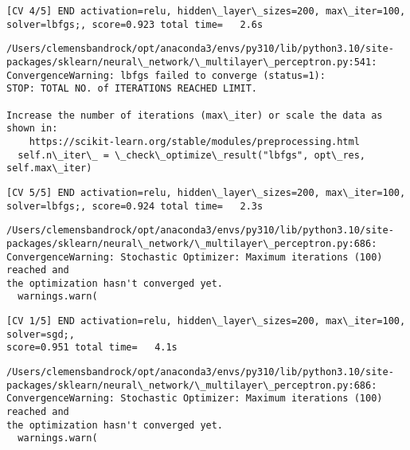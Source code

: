 \documentclass[11pt]{article}
\begin{document}
    \begin{Verbatim}[commandchars=\\\{\}]
[CV 4/5] END activation=relu, hidden\_layer\_sizes=200, max\_iter=100,
solver=lbfgs;, score=0.923 total time=   2.6s
    \end{Verbatim}

    \begin{Verbatim}[commandchars=\\\{\}]
/Users/clemensbandrock/opt/anaconda3/envs/py310/lib/python3.10/site-
packages/sklearn/neural\_network/\_multilayer\_perceptron.py:541:
ConvergenceWarning: lbfgs failed to converge (status=1):
STOP: TOTAL NO. of ITERATIONS REACHED LIMIT.

Increase the number of iterations (max\_iter) or scale the data as shown in:
    https://scikit-learn.org/stable/modules/preprocessing.html
  self.n\_iter\_ = \_check\_optimize\_result("lbfgs", opt\_res, self.max\_iter)
    \end{Verbatim}

    \begin{Verbatim}[commandchars=\\\{\}]
[CV 5/5] END activation=relu, hidden\_layer\_sizes=200, max\_iter=100,
solver=lbfgs;, score=0.924 total time=   2.3s
    \end{Verbatim}

    \begin{Verbatim}[commandchars=\\\{\}]
/Users/clemensbandrock/opt/anaconda3/envs/py310/lib/python3.10/site-
packages/sklearn/neural\_network/\_multilayer\_perceptron.py:686:
ConvergenceWarning: Stochastic Optimizer: Maximum iterations (100) reached and
the optimization hasn't converged yet.
  warnings.warn(
    \end{Verbatim}

    \begin{Verbatim}[commandchars=\\\{\}]
[CV 1/5] END activation=relu, hidden\_layer\_sizes=200, max\_iter=100, solver=sgd;,
score=0.951 total time=   4.1s
    \end{Verbatim}

    \begin{Verbatim}[commandchars=\\\{\}]
/Users/clemensbandrock/opt/anaconda3/envs/py310/lib/python3.10/site-
packages/sklearn/neural\_network/\_multilayer\_perceptron.py:686:
ConvergenceWarning: Stochastic Optimizer: Maximum iterations (100) reached and
the optimization hasn't converged yet.
  warnings.warn(
    \end{Verbatim}
\end{document}
